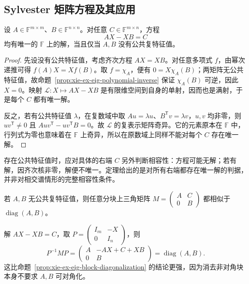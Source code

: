 \subsection{Sylvester 矩阵方程及其应用}
\label{subsec:xie-ex-eig-sylvester}

\begin{theorem}
\label{thm:xie-ex-eig-sylvester}
设 $A\in\mathbb F^{m\times m}$、$B\in\mathbb F^{n\times n}$。对任意 $C\in\mathbb F^{m\times n}$，方程
\begin{equation}
AX-XB=C
\label{eq:xie-ex-eig-sylvester-equation}
\end{equation}
均有唯一的 $\mathbb F$ 上的解，当且仅当 $A,B$ 没有公共复特征值。
\end{theorem}
\begin{proof}
先设没有公共特征值，考虑齐次方程 $AX=XB$。对任意多项式 $f$，由幂次递推可得 $f(A)X=Xf(B)$。取 $f=\chi_A$，便有 $0=X\chi_A(B)$；两矩阵无公共特征值，故命题~\ref{prop:xie-ex-eig-polynomial-inverse} 保证 $\chi_A(B)$ 可逆，因此 $X=0$。映射 $\mathcal L\colon X\mapsto AX-XB$ 是有限维空间到自身的单射，因而也是满射，于是每个 $C$ 都有唯一解。

反之，若有公共特征值 $\lambda$，在复数域中取 $Au=\lambda u$、$B^{\mathsf T}v=\lambda v$，$u,v$ 均非零，则 $uv^{\mathsf T}\ne0$ 且 $Auv^{\mathsf T}-uv^{\mathsf T}B=0$。故 $\mathcal L$ 的复表示矩阵奇异。它的元素原本在 $\mathbb F$ 中，行列式为零也意味着在 $\mathbb F$ 上奇异，所以在原数域上同样不能对每个 $C$ 存在唯一解。
\end{proof}

存在公共特征值时，应对具体的右端 $C$ 另外判断相容性：方程可能无解；若有解，因齐次核非零，解便不唯一。定理给出的是对所有右端都存在唯一解的判据，并非对相交谱情形的完整相容性条件。

\begin{example}
若 $A,B$ 无公共复特征值，则任意分块上三角矩阵 $M=\begin{pmatrix}A&C\\0&B\end{pmatrix}$ 都相似于 $\operatorname{diag}(A,B)$。
\end{example}
\begin{solve}
解 $AX-XB=C$，取 $P=\begin{pmatrix}I_m&-X\\0&I_n\end{pmatrix}$，则
\[
P^{-1}MP
=\begin{pmatrix}A&-AX+C+XB\\0&B\end{pmatrix}
=\operatorname{diag}(A,B).
\]
这比命题~\ref{prop:xie-ex-eig-block-diagonalization} 的结论更强，因为消去非对角块本身不要求 $A,B$ 可对角化。
\end{solve}

